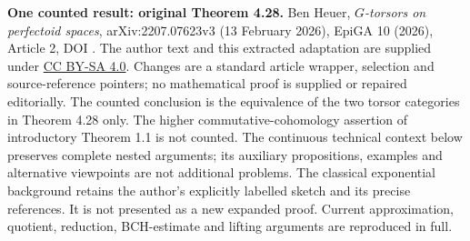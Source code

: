 \noindent\textbf{One counted result: original Theorem 4.28.}
Ben Heuer, \emph{$G$-torsors on perfectoid spaces}, arXiv:2207.07623v3 (13 February 2026), EpiGA 10 (2026), Article 2, DOI .
The author text and this extracted adaptation are supplied under \href{https://creativecommons.org/licenses/by-sa/4.0/}{CC BY-SA 4.0}. Changes are a standard article wrapper, selection and source-reference pointers; no mathematical proof is supplied or repaired editorially.
The counted conclusion is the equivalence of the two torsor categories in Theorem 4.28 only. The higher commutative-cohomology assertion of introductory Theorem 1.1 is not counted. The continuous technical context below preserves complete nested arguments; its auxiliary propositions, examples and alternative viewpoints are not additional problems.
The classical exponential background retains the author's explicitly labelled sketch and its precise references. It is not presented as a new expanded proof. Current approximation, quotient, reduction, BCH-estimate and lifting arguments are reproduced in full.
\par\medskip

